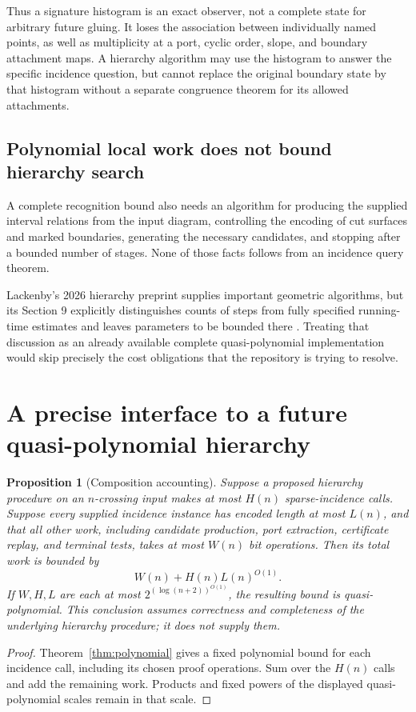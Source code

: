 \documentclass[11pt,letterpaper]{article}
\newtheorem{proposition}[theorem]{Proposition}
\begin{document}
Thus a signature histogram is an exact observer, not a complete state for
arbitrary future gluing. It loses the association between individually named
points, as well as multiplicity at a port, cyclic order, slope, and boundary
attachment maps. A hierarchy algorithm may use the histogram to answer the
specific incidence question, but cannot replace the original boundary state
by that histogram without a separate congruence theorem for its allowed
attachments.

\subsection{Polynomial local work does not bound hierarchy search}
A complete recognition bound also needs an algorithm for producing the
supplied interval relations from the input diagram, controlling the encoding
of cut surfaces and marked boundaries, generating the necessary candidates,
and stopping after a bounded number of stages. None of those facts follows
from an incidence query theorem.

Lackenby's 2026 hierarchy preprint supplies important geometric algorithms,
but its Section 9 explicitly distinguishes counts of steps from fully
specified running-time estimates and leaves parameters to be bounded there
\cite{lackenby}. Treating that discussion as an already available complete
quasi-polynomial implementation would skip precisely the cost obligations
that the repository is trying to resolve.

\section{A precise interface to a future quasi-polynomial hierarchy}
\label{sec:hierarchy}

\begin{proposition}[Composition accounting]
\label{prop:composition}
Suppose a proposed hierarchy procedure on an $n$-crossing input makes at most
$H(n)$ sparse-incidence calls. Suppose every supplied incidence instance has
encoded length at most $L(n)$, and that all other work, including candidate
production, port extraction, certificate replay, and terminal tests, takes
at most $W(n)$ bit operations. Then its total work is bounded by
\[
 W(n)+H(n)L(n)^{O(1)}.
\]
If $W,H,L$ are each at most $2^{(\log(n+2))^{O(1)}}$, the resulting bound is
quasi-polynomial. This conclusion assumes correctness and completeness of the
underlying hierarchy procedure; it does not supply them.
\end{proposition}
\begin{proof}
Theorem~\ref{thm:polynomial} gives a fixed polynomial bound for each incidence
call, including its chosen proof operations. Sum over the $H(n)$ calls and
add the remaining work. Products and fixed powers of the displayed
quasi-polynomial scales remain in that scale.
\end{proof}
\end{document}
